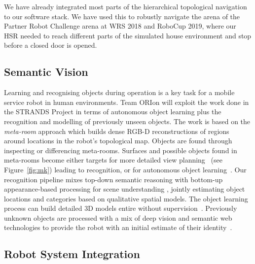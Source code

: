 \documentclass[runningheads,a4paper]{llncs}
\newcommand{\teamori}{Team ORIon}
\begin{document}
We have already integrated most parts of the hierarchical topological navigation
to our software stack. We have used this to robustly navigate the arena of
the Partner Robot Challenge arena at WRS 2018 and RoboCup 2019, where our HSR needed to reach
different parts of the simulated house environment and stop before a closed
door is opened. 

\subsection{Semantic Vision}

Learning and recognising objects during operation is a key task for a mobile service robot in human environments. \teamori{} will exploit the work done in the STRANDS Project in terms of autonomous object learning plus the recognition and modelling of previously unseen objects. The work is based on the \emph{meta-room} approach which builds dense RGB-D reconstructions of regions around locations in the robot's topological map. Objects are found through inspecting or differencing meta-rooms. Surfaces and possible objects found in meta-rooms become either targets for more detailed view planning~\cite{kunze14indirect} (see Figure~\ref{fig:mk}) leading to recognition, or for autonomous object learning~\cite{Faeulhammer:2016}. Our recognition pipeline mixes top-down semantic reasoning with bottom-up appearance-based processing for scene understanding \cite{kunze14topdown}, jointly estimating object locations and categories based on qualitative spatial models\cite{kunze14bootstrapping}. The object learning process can build detailed 3D models entire without supervision~\cite{Faeulhammer:2016}. Previously unknown  objects are processed with a mix of deep vision and semantic web technologies to provide the robot with an initial estimate of their identity~\cite{aloof@icra17}.


\subsection{Robot System Integration}
\end{document}
